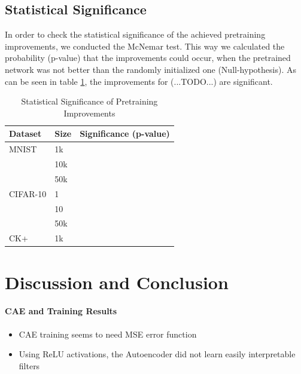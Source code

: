 \documentclass{article}
\begin{document}
  \subsection{Statistical Significance}
    In order to check the statistical significance of the achieved pretraining improvements, we conducted the McNemar test. This way we calculated the probability (p-value) that the improvements could occur, when the pretrained network was not better than the randomly initialized one (Null-hypothesis).
    As can be seen in table \ref{table:significance}, the improvements for (...TODO...) are significant.
    \begin{table}
      \caption{Statistical Significance of Pretraining Improvements}
      \label{table:significance}
      \centering
      \begin{tabular}{lll}
        \toprule
        Dataset     & Size     & Significance (p-value) \\
        \midrule
        MNIST & 1k  &     \\
        & 10k  &      \\
        & 50k  &     \\
        \midrule
        CIFAR-10     & 1 &     \\
        & 10 &      \\
        & 50k &      \\
        \midrule
        CK+     & 1k      &  \\
        \bottomrule
      \end{tabular}
    \end{table}


\section{Discussion and Conclusion}

  \paragraph{CAE and Training Results}
  \begin{itemize}
    \item CAE training seems to need MSE error function
    \item Using ReLU activations, the Autoencoder did not learn easily interpretable filters
  \end{itemize}
\end{document}
